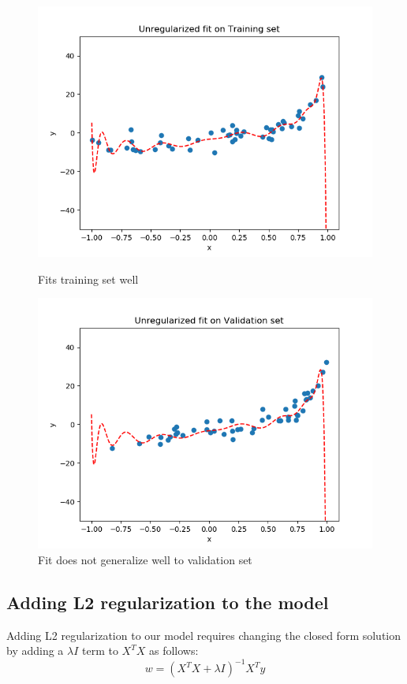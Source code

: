 \documentclass[paper=a4, fontsize=11pt]{scrartcl} %
\numberwithin{equation}{section} %
\numberwithin{figure}{section} %
\numberwithin{table}{section} %
\begin{document}
\begin{figure}[H]
    \includegraphics[width=\linewidth]{q1p12.png}
    \caption{Fits training set well}
    \label{fig:q1p12}
    \includegraphics[width=\linewidth]{q1p13.png}
    \caption{Fit does not generalize well to validation set}
    \label{fig:q1p13}
\end{figure}

\subsection{Adding L2 regularization to the model}
Adding L2 regularization to our model requires changing the closed form solution by adding a \( \lambda I \) term to \(X^TX\) as follows:
\[ w = (X^TX + \lambda I)^{-1}X^Ty \]
\end{document}
